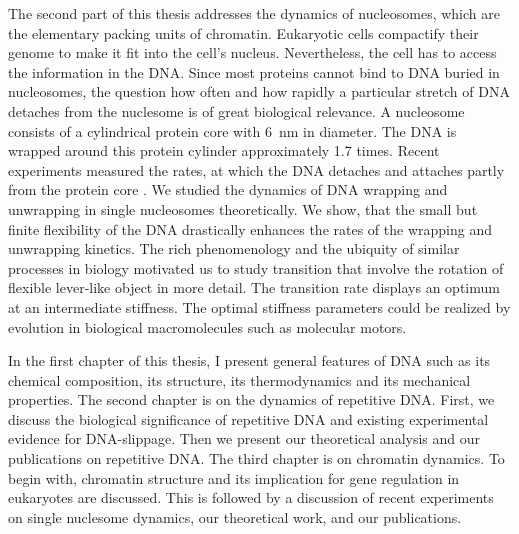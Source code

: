 The second part of this thesis addresses the dynamics of nucleosomes, which are the elementary 
packing units of chromatin. Eukaryotic cells compactify their genome to make it fit into the cell's nucleus.
Nevertheless, the cell has to access the information in the DNA. Since most proteins cannot bind 
to DNA buried in nucleosomes, the question how often and how rapidly a particular 
stretch of DNA detaches from the nuclesome is of great biological relevance. 
A nucleosome consists of a cylindrical protein core with 6~nm in diameter. The DNA is wrapped
around this protein cylinder approximately 1.7 times. Recent experiments measured the rates,
at which the DNA detaches and attaches partly from the protein core \cite{Li_NatureStructMolBio_05, Tomschik_PNAS_05}.
We studied the dynamics of DNA wrapping and unwrapping in single nucleosomes theoretically.
We show, that the small but finite flexibility of the DNA drastically enhances the rates of the 
wrapping and unwrapping kinetics. The rich phenomenology and the ubiquity of similar
processes in biology motivated us to study transition that involve the rotation of flexible
lever-like object in more detail. The transition rate displays an optimum at an intermediate 
stiffness. The optimal stiffness parameters could be realized by evolution in biological macromolecules
such as molecular motors.

In the first chapter of this thesis, I present general features of DNA such as its chemical 
composition, its structure, its thermodynamics and its mechanical properties. The second
chapter is on the dynamics of repetitive DNA. First, we discuss the biological significance of repetitive DNA
and existing experimental evidence for DNA-slippage. Then we present our theoretical analysis
and our publications on repetitive DNA. The third chapter is on chromatin dynamics. To begin with,
chromatin structure and its implication for gene regulation in eukaryotes are discussed. This is 
followed by a discussion of recent experiments on single nuclesome dynamics, our theoretical
work, and our publications.
